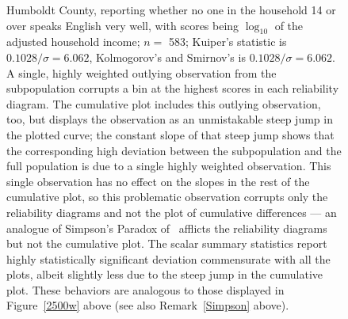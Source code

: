 \documentclass{article}
\begin{document}
\begin{figure}
\begin{centering}
\end{centering}
\caption{Humboldt County, reporting whether no one in the household 14 or over
         speaks English very well, with scores being $\log_{10}$
         of the adjusted household income;
         $n =$ 583; Kuiper's statistic is $0.1028 / \sigma = 6.062$,
         Kolmogorov's and Smirnov's is $0.1028 / \sigma = 6.062$.
A single, highly weighted outlying observation
from the subpopulation corrupts a bin at the highest scores
in each reliability diagram. The cumulative plot
includes this outlying observation, too, but displays the observation as
an unmistakable steep jump in the plotted curve; the constant slope
of that steep jump shows that the corresponding high deviation
between the subpopulation and the full population is due
to a single highly weighted observation. This single observation has no effect
on the slopes in the rest of the cumulative plot,
so this problematic observation corrupts only the reliability diagrams
and not the plot of cumulative differences
--- an analogue of Simpson's Paradox of~\cite{simpson}
afflicts the reliability diagrams but not the cumulative plot.
The scalar summary statistics report highly statistically significant deviation
commensurate with all the plots, albeit slightly less due to the steep jump
in the cumulative plot. These behaviors are analogous to those displayed
in Figure~\ref{2500w} above (see also Remark~\ref{Simpson} above).
}
\label{humboldt}
\end{figure}
\end{document}
